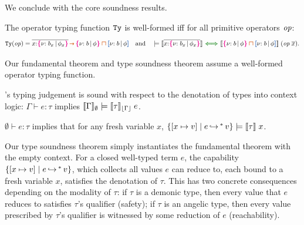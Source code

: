 We conclude with the core soundness results.

\begin{definition} %
  \label{thm:well-formed-operator}
  The operator typing function ${\tt Ty}$ is well-formed iff for all primitive
  operators $\mathit{op}$: {\small\vspace{-0.2em}
  \begin{align*} \Code{Ty}(\primop) =
      \overline{x{:}\ort{b_x}{\phi_x}} \ctsarr \ort{b}{\phi} \ctinter
      \urt{b}{\phi} \quad\text{and}\quad \models
      \denot{\overline{x{:}\ort{b_x}{\phi_x}}} \chiff
      \denot{\ort{b}{\phi} \ctinter
        \urt{b}{\phi}}\;(\primop\;\overline{x}).
  \end{align*}}
\end{definition}

Our fundamental theorem and type soundness theorem assume a
well-formed operator typing function.

\begin{theorem}%
  \label{thm:fundamental}
  \langname{}'s typing judgement
  is sound with respect to the denotation of types into context logic:
  $\Gamma \vdash e : \tau$ implies
  $\llbracket {\Gamma} \rrbracket_\emptyset \models
  \llbracket {\tau} \rrbracket_{\lfloor {\Gamma} \rfloor}\;e$. %
\end{theorem}

\begin{corollary}%
  \label{thm:soundness}
  $\emptyset \vdash e : \tau$ implies that for any fresh variable $x$,
  $\{[x \mapsto v] \mid {e}{{\,\hookrightarrow\,}^*\,}{v}\} \models \llbracket {\tau} \rrbracket\;x$.
\end{corollary}

Our type soundness theorem simply instantiates the fundamental theorem
with the empty context. For a closed well-typed term $e$, the
capability $\{[x \mapsto v] \mid {e}{{\,\hookrightarrow\,}^*\,}{v}\}$, which collects all
values $e$ can reduce to, each bound to a fresh variable $x$,
satisfies the denotation of $\tau$. This has two concrete consequences
depending on the modality of $\tau$: if $\tau$ is a demonic type, then
every value that $e$ reduces to satisfies $\tau$'s qualifier (safety);
if $\tau$ is an angelic type, then every value prescribed by $\tau$'s
qualifier is witnessed by some reduction of $e$ (reachability).
